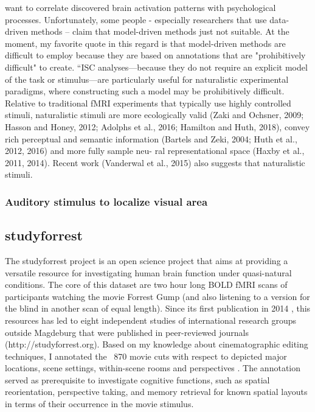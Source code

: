 want to correlate discovered brain activation patterns with psychological
processes.  Unfortunately, some people - especially researchers that use
data-driven methods – claim that model-driven methods just not suitable.  At the
moment, my favorite quote in this regard is that model-driven methods are
difficult to employ because they are based on annotations that are
"prohibitively difficult" to create.
%
``ISC analyses—because they do not require an explicit model of the task or
stimulus—are particularly useful for naturalistic experimental paradigms, where
constructing such a model may be prohibitively difficult.  Relative to
traditional fMRI experiments that typically use highly controlled stimuli,
naturalistic stimuli are more ecologically valid (Zaki and Ochsner, 2009; Hasson
and Honey, 2012; Adolphs et al., 2016; Hamilton and Huth, 2018), convey rich
perceptual and semantic information (Bartels and Zeki, 2004; Huth et al., 2012,
2016) and more fully sample neu- ral representational space (Haxby et al., 2011,
2014). Recent work (Vanderwal et al., 2015) also suggests that naturalistic
stimuli. \citep{nastase2019measuring}



\subsubsection{Auditory stimulus to localize visual area}


\subsection{studyforrest}
%
The studyforrest project is an open science project that aims at providing a
versatile resource for investigating human brain function under quasi-natural
conditions.
%
The core of this dataset are two hour long BOLD fMRI scans of participants
watching the movie Forrest Gump (and also listening to a version for the blind
in another scan of equal length).
%
Since its first publication in 2014 \citep{hanke2014audiomovie}, this resources
has led to eight independent studies of international research groups outside
Magdeburg that were published in peer-reviewed journals
(http://studyforrest.org).
%
Based on my knowledge about cinematographic editing techniques, I annotated the
~870 movie cuts with respect to depicted major locations, scene settings,
within-scene rooms and perspectives \citep{haeusler2016cutanno}.
%
The annotation served as prerequisite to investigate cognitive functions, such
as spatial reorientation, perspective taking, and memory retrieval for known
spatial layouts in terms of their occurrence in the movie stimulus.


